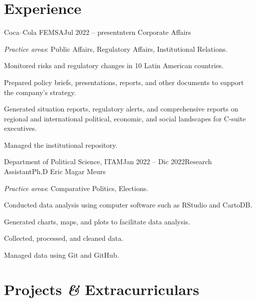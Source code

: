 \documentclass[letter]{resume}
\begin{document}
\section{Experience}
\begin{content}

\begin{position}{Coca–Cola FEMSA}{Jul 2022 -- present}{ntern Corporate Affairs}{}{}

  \item {\emph{Practice areas}}: Public Affairs, Regulatory Affairs, Institutional Relations.
  \item Monitored risks and regulatory changes in 10 Latin American countries.
  \item Prepared policy briefs, presentations, reports, and other documents to support the company's strategy.
  \item Generated situation reports, regulatory alerts, and comprehensive reports on regional and international political, economic, and social landscapes for C-suite executives.
  \item Managed the institutional repository.

\end{position}
\vspace{-.0001 \baselineskip}

\begin{position}{Department of Political Science, ITAM}{Jan 2022 -- Dic 2022}{Research Assistant}{Ph.D Eric Magar Meurs}{}

  \item {\emph{Practice areas}}: Comparative Politics, Elections.
  \item Conducted data analysis using computer software such as RStudio and CartoDB.
  \item Generated charts, maps, and plots to facilitate data analysis.
  \item Collected, processed, and cleaned data.
  \item Managed data using Git and GitHub.

\end{position}
\vspace{-.0001 \baselineskip}

\sectionlineskip
\end{content}

\section{Projects \textbf{\em\&} Extracurriculars} 
\end{document}
